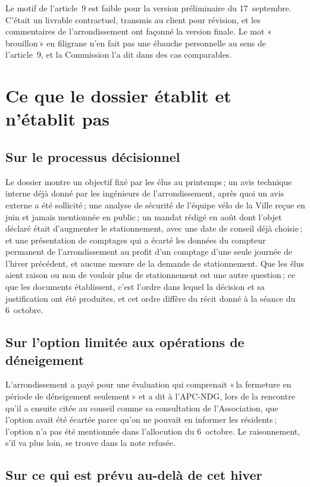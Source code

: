 \documentclass[11pt,letterpaper]{article}
\begin{document}
Le motif de l'article~9 est faible pour la version préliminaire du
17~septembre. C'était un livrable contractuel, transmis au client pour
révision, et les commentaires de l'arrondissement ont façonné la version
finale. Le mot «\,brouillon\,» en filigrane n'en fait pas une ébauche
personnelle au sens de l'article~9, et la Commission l'a dit dans des cas
comparables.

\section{Ce que le dossier établit et n'établit pas}

\subsection{Sur le processus décisionnel}

Le dossier montre un objectif fixé par les élus au printemps\,; un avis
technique interne déjà donné par les ingénieurs de l'arrondissement, après
quoi un avis externe a été sollicité\,; une analyse de sécurité de l'équipe
vélo de la Ville reçue en juin et jamais mentionnée en public\,; un mandat
rédigé en août dont l'objet déclaré était d'augmenter le stationnement,
avec une date de conseil déjà choisie\,; et une présentation de comptages
qui a écarté les données du compteur permanent de l'arrondissement au
profit d'un comptage d'une seule journée de l'hiver précédent, et aucune
mesure de la demande de stationnement. Que les élus
aient raison ou non de vouloir plus de stationnement est une autre
question\,; ce que les documents établissent, c'est l'ordre dans lequel la
décision et sa justification ont été produites, et cet ordre diffère du
récit donné à la séance du 6~octobre.

\subsection{Sur l'option limitée aux opérations de déneigement}

L'arrondissement a payé pour une évaluation qui comprenait «\,la fermeture
en période de déneigement seulement\,» et a dit à l'APC-NDG, lors de la
rencontre qu'il a ensuite citée au conseil comme sa consultation de
l'Association, que l'option avait été écartée parce qu'on ne pouvait en
informer les résidents\,; l'option n'a pas été mentionnée dans l'allocution
du 6~octobre. Le raisonnement, s'il va plus loin, se trouve dans la note
refusée.

\subsection{Sur ce qui est prévu au-delà de cet hiver}
\end{document}
